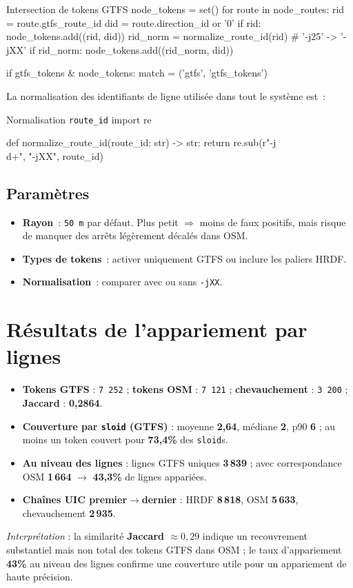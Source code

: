 \begin{codebox}[language=Python]{Intersection de tokens GTFS}
node_tokens = set()
for route in node_routes:
    rid = route.gtfs_route_id
    did = route.direction_id or '0'
    if rid:
        node_tokens.add((rid, did))
        rid_norm = normalize_route_id(rid)  # '-j25' -> '-jXX'
        if rid_norm:
            node_tokens.add((rid_norm, did))

if gtfs_tokens & node_tokens:
    match = ('gtfs', 'gtfs_tokens')
\end{codebox}

La normalisation des identifiants de ligne utilisée dans tout le système est :

\begin{codebox}[language=Python]{Normalisation \texttt{route\_id}}
import re

def normalize_route_id(route_id: str) -> str:
    return re.sub(r"-j\\d+", "-jXX", route_id)
\end{codebox}

\subsection{Paramètres}
\begin{itemize}
  \item \textbf{Rayon} : \texttt{50 m} par défaut. Plus petit $\Rightarrow$ moins de faux positifs, mais risque de manquer des arrêts légèrement décalés dans OSM.
  \item \textbf{Types de tokens} : activer uniquement GTFS ou inclure les paliers HRDF.
  \item \textbf{Normalisation} : comparer avec ou sans \texttt{-jXX}.
\end{itemize}

\section{Résultats de l'appariement par lignes}
\begin{itemize}
  \item \textbf{Tokens GTFS} : \texttt{7\,252} ; \textbf{tokens OSM} : \texttt{7\,121} ; \textbf{chevauchement} : \texttt{3\,200} ; \textbf{Jaccard} : \textbf{0,2864}.
  \item \textbf{Couverture par \texttt{sloid} (GTFS)} : moyenne \textbf{2,64}, médiane \textbf{2}, p90 \textbf{6} ; au moins un token couvert pour \textbf{73,4\%} des \texttt{sloid}s.
  \item \textbf{Au niveau des lignes} : lignes GTFS uniques \textbf{3\,839} ; avec correspondance OSM \textbf{1\,664} $\rightarrow$ \textbf{43,3\%} de lignes appariées.
  \item \textbf{Chaînes UIC premier$\rightarrow$dernier} : HRDF \textbf{8\,818}, OSM \textbf{5\,633}, chevauchement \textbf{2\,935}.
\end{itemize}
\noindent \emph{Interprétation} : la similarité \textbf{Jaccard $\approx 0{,}29$} indique un recouvrement substantiel mais non total des tokens GTFS dans OSM ; le taux d'appariement \textbf{43\%} au niveau des lignes confirme une couverture utile pour un appariement de haute précision.

